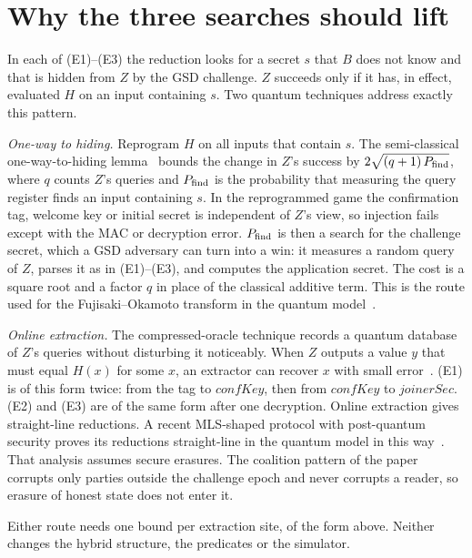 \documentclass[aps,prx,reprint,superscriptaddress,nofootinbib,floatfix]{revtex4-2}
\theoremstyle{remark}
\begin{document}
\section{Why the three searches should lift}

In each of (E1)--(E3) the reduction looks for a secret $s$ that $B$ does not know and that is hidden from $Z$ by the GSD challenge. $Z$ succeeds only if it has, in effect, evaluated $H$ on an input containing $s$. Two quantum techniques address exactly this pattern.

\emph{One-way to hiding.} Reprogram $H$ on all inputs that contain $s$. The semi-classical one-way-to-hiding lemma~\cite{o2h} bounds the change in $Z$'s success by $2\sqrt{(q+1)\,P_{\rm find}}$, where $q$ counts $Z$'s queries and $P_{\rm find}$ is the probability that measuring the query register finds an input containing $s$. In the reprogrammed game the confirmation tag, welcome key or initial secret is independent of $Z$'s view, so injection fails except with the MAC or decryption error. $P_{\rm find}$ is then a search for the challenge secret, which a GSD adversary can turn into a win: it measures a random query of $Z$, parses it as in (E1)--(E3), and computes the application secret. The cost is a square root and a factor $q$ in place of the classical additive term. This is the route used for the Fujisaki--Okamoto transform in the quantum model~\cite{hhk,o2h}.

\emph{Online extraction.} The compressed-oracle technique records a quantum database of $Z$'s queries without disturbing it noticeably. When $Z$ outputs a value $y$ that must equal $H(x)$ for some $x$, an extractor can recover $x$ with small error~\cite{dfms22}. (E1) is of this form twice: from the tag to $\mathit{confKey}$, then from $\mathit{confKey}$ to $\mathit{joinerSec}$. (E2) and (E3) are of the same form after one decryption. Online extraction gives straight-line reductions. A recent MLS-shaped protocol with post-quantum security proves its reductions straight-line in the quantum model in this way~\cite{au-cgka}. That analysis assumes secure erasures. The coalition pattern of the paper corrupts only parties outside the challenge epoch and never corrupts a reader, so erasure of honest state does not enter it.

Either route needs one bound per extraction site, of the form above. Neither changes the hybrid structure, the predicates or the simulator.
\end{document}
